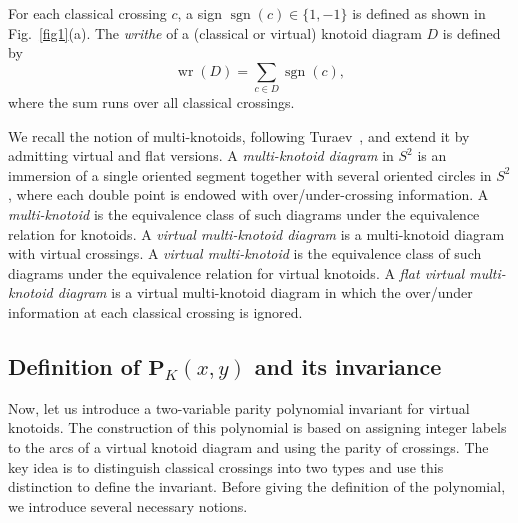 \documentclass[12pt]{amsart}
\theoremstyle{noparens}
\numberwithin{equation}{section}
\numberwithin{equation}{section}
\begin{document}
For each classical crossing $c$, a sign $\operatorname{sgn}(c) \in \{1,-1\}$ is defined as shown in Fig.~\ref{fig1}(a). The \textit{writhe} of a (classical or virtual) knotoid diagram $D$ is defined by
\begin{equation}
	\operatorname{wr}(D) = \sum_{c \in D} \operatorname{sgn}(c),
\end{equation}
where the sum runs over all classical crossings. 

We recall the notion of multi-knotoids, following Turaev~\cite{Tur1}, and extend it by admitting virtual and flat versions. A \textit{multi-knotoid diagram} in $S^2$ is an immersion of a single oriented segment together with several oriented circles in $S^2$, where each double point is endowed with over/under-crossing information. A \textit{multi-knotoid} is the equivalence class of such diagrams under the equivalence relation for knotoids. A \textit{virtual multi-knotoid diagram} is a multi-knotoid diagram with virtual crossings. A \textit{virtual multi-knotoid} is the equivalence class of such diagrams under the equivalence relation for virtual knotoids. A \textit{flat virtual multi-knotoid diagram} is a virtual multi-knotoid diagram in which the over/under information at each classical crossing is ignored. 

\subsection{Definition of $\mathbf{P}_K(x,y)$ and its invariance} \label{subsection2.2}

Now, let us introduce a two-variable parity polynomial invariant for virtual knotoids. The construction of this polynomial is based on assigning integer labels to the arcs of a virtual knotoid diagram and using the parity of crossings. The key idea is to distinguish classical crossings into two types and use this distinction to define the invariant. Before giving the definition of the polynomial, we introduce several necessary notions.
\end{document}
